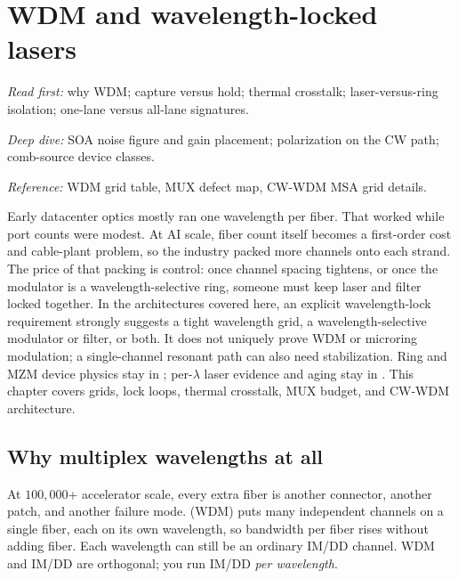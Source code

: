 \chapter{WDM and wavelength-locked lasers}
\label{ch:wdm}

\textit{Read first:} why WDM; capture versus hold; thermal crosstalk;
laser-versus-ring isolation; one-lane versus all-lane signatures.

\textit{Deep dive:} SOA noise figure and gain placement; polarization on the CW
path; comb-source device classes.

\textit{Reference:} WDM grid table, MUX defect map, CW-WDM MSA grid details.

Early datacenter optics mostly ran one wavelength per fiber. That worked while
port counts were modest. At AI scale, fiber count itself becomes a first-order
cost and cable-plant problem, so the industry packed more channels onto each
strand. The price of that packing is control: once channel spacing tightens, or
once the modulator is a wavelength-selective ring, someone must keep laser and
filter locked together. In the architectures covered here, an explicit
wavelength-lock requirement strongly suggests a tight wavelength grid, a
wavelength-selective modulator or filter, or both. It does not uniquely prove
WDM or microring modulation; a single-channel resonant path can also need
stabilization. Ring and MZM device physics stay in
; per-$\lambda$ laser evidence and aging stay in
. This chapter covers grids, lock loops, thermal crosstalk, MUX
budget, and CW-WDM architecture.


\section{Why multiplex wavelengths at all}
\label{sec:why-wdm}

At $100{,}000$+ accelerator scale, every extra fiber is another connector,
another patch, and another failure mode. 
(WDM) puts many independent channels on a single fiber, each on its own
wavelength, so bandwidth per fiber rises without adding fiber. Each wavelength
can still be an ordinary IM/DD channel. WDM and IM/DD are orthogonal; you run
IM/DD \emph{per wavelength}.

